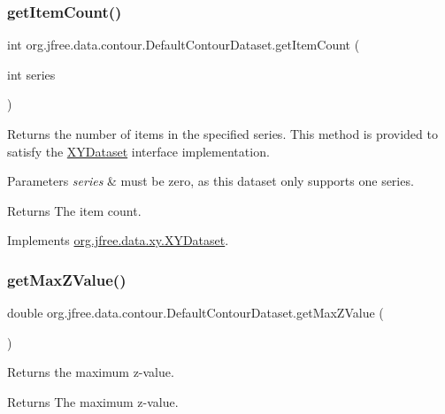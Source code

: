 \subsubsection{\texorpdfstring{get\+Item\+Count()}{getItemCount()}}
{\footnotesize\ttfamily int org.\+jfree.\+data.\+contour.\+Default\+Contour\+Dataset.\+get\+Item\+Count (\begin{DoxyParamCaption}\item[{int}]{series }\end{DoxyParamCaption})}

Returns the number of items in the specified series. This method is provided to satisfy the \mbox{\hyperlink{}{X\+Y\+Dataset}} interface implementation.


\begin{DoxyParams}{Parameters}
{\em series} & must be zero, as this dataset only supports one series.\\
\hline
\end{DoxyParams}
\begin{DoxyReturn}{Returns}
The item count. 
\end{DoxyReturn}


Implements \mbox{\hyperlink{interfaceorg_1_1jfree_1_1data_1_1xy_1_1_x_y_dataset_ae81f9de91dfcae45028fc8a486a119da}{org.\+jfree.\+data.\+xy.\+X\+Y\+Dataset}}.

\mbox{\label{classorg_1_1jfree_1_1data_1_1contour_1_1_default_contour_dataset_a168e0cef5e2f7695f22b2af5f4808b57}} 
\subsubsection{\texorpdfstring{get\+Max\+Z\+Value()}{getMaxZValue()}}
{\footnotesize\ttfamily double org.\+jfree.\+data.\+contour.\+Default\+Contour\+Dataset.\+get\+Max\+Z\+Value (\begin{DoxyParamCaption}{ }\end{DoxyParamCaption})}

Returns the maximum z-\/value.

\begin{DoxyReturn}{Returns}
The maximum z-\/value. 
\end{DoxyReturn}


